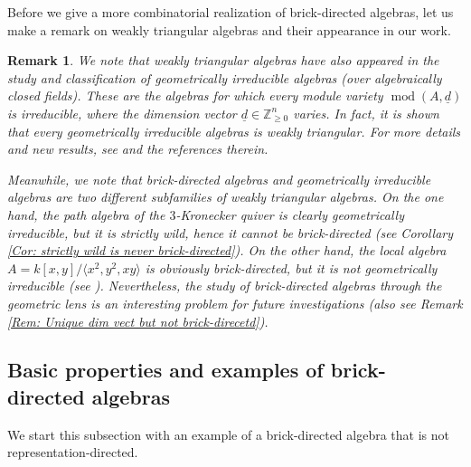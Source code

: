 \documentclass{amsart}
\theoremstyle{thmstyle}
\theoremstyle{exstyle}
\theoremstyle{defstyle}
\theoremstyle{remstyle}
\newtheorem{remark}[thm]{Remark}
\theoremstyle{remstyle}
\DeclareMathOperator*{\modu}{mod}
\begin{document}
Before we give a more combinatorial realization of brick-directed algebras, let us make a remark on weakly triangular algebras and their appearance in our work.

\begin{remark}
We note that weakly triangular algebras have also appeared in the study and classification of \emph{geometrically irreducible algebras} (over algebraically closed fields). These are the algebras for which every module variety $\modu (A,\underline{d})$ is irreducible, where the dimension vector $\underline{d} \in \mathbb{Z}^n_{\geq 0}$ varies. In fact, it is shown that every geometrically irreducible algebras is weakly triangular. For more details and new results, see \cite{BZ} and the references therein. 

Meanwhile, we note that brick-directed algebras and geometrically irreducible algebras are two different subfamilies of weakly triangular algebras.
On the one hand, the path algebra of the $3$-Kronecker quiver is clearly geometrically irreducible, but it is strictly wild, hence it cannot be brick-directed (see Corollary \ref{Cor: strictly wild is never brick-directed}). On the other hand, the local algebra $A=k[x,y]/\langle x^2, y^2, xy\rangle$ is obviously brick-directed, but it is not geometrically irreducible (see \cite[Lemma 2.1]{BZ}). Nevertheless, the study of brick-directed algebras through the geometric lens is an interesting problem for future investigations (also see Remark \ref{Rem: Unique dim vect but not brick-direcetd}).
\end{remark}


\subsection{Basic properties and examples of brick-directed algebras}


We start this subsection with an example of a brick-directed algebra that is not representation-directed.
\end{document}
